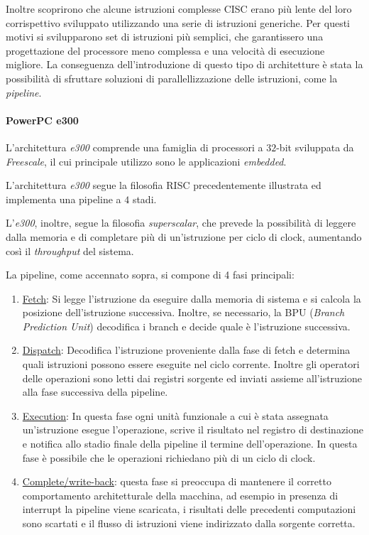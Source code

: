 Inoltre scoprirono che alcune istruzioni complesse CISC erano più lente del loro corrispettivo sviluppato utilizzando una serie di istruzioni generiche. Per questi motivi si svilupparono set di istruzioni più semplici, che garantissero una progettazione del processore meno complessa e una velocità di esecuzione migliore.
La conseguenza dell'introduzione di questo tipo di architetture è stata la possibilità di sfruttare soluzioni di parallellizzazione delle istruzioni, come la \textit{pipeline}.

\paragraph{PowerPC e300}
L'architettura \textit{e300} comprende una famiglia di processori a $32$-bit sviluppata da \textit{Freescale}, il cui principale utilizzo sono le applicazioni \textit{embedded}.

L'architettura \textit{e300} segue la filosofia RISC precedentemente illustrata ed implementa una pipeline a $4$ stadi. 

L'\textit{e300}, inoltre, segue la filosofia \textit{superscalar}, che prevede la possibilità di leggere dalla memoria e di completare più di un'istruzione per ciclo di clock, aumentando così il \textit{throughput} del sistema.

La pipeline, come accennato sopra, si compone di 4 fasi principali:

\begin{enumerate}
	\item \underline{Fetch}: Si legge l'istruzione da eseguire dalla memoria di sistema e si calcola la posizione dell'istruzione successiva. Inoltre, se necessario, la BPU (\textit{Branch Prediction Unit}) decodifica i branch e decide quale è l'istruzione successiva.
	\item \underline{Dispatch}: Decodifica l'istruzione proveniente dalla fase di fetch e determina quali istruzioni possono essere eseguite nel ciclo corrente. Inoltre gli operatori delle operazioni sono letti dai registri sorgente ed inviati assieme all'istruzione alla fase successiva della pipeline.
	\item \underline{Execution}: In questa fase ogni unità funzionale a cui è stata assegnata un'istruzione esegue l'operazione, scrive il risultato nel registro di destinazione e notifica allo stadio finale della pipeline il termine dell'operazione. In questa fase è possibile che le operazioni richiedano più di un ciclo di clock.
	\item \underline{Complete/write-back}: questa fase si preoccupa di mantenere il corretto comportamento architetturale della macchina, ad esempio in presenza di interrupt la pipeline viene scaricata, i risultati delle precedenti computazioni sono scartati e il flusso di istruzioni viene indirizzato dalla sorgente corretta.
\end{enumerate}

